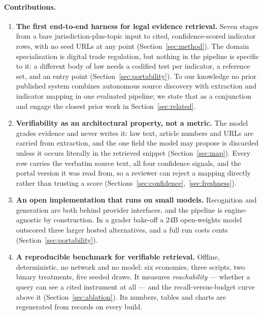 \documentclass{article}
\begin{document}
\paragraph{Contributions.}
\begin{enumerate}
\item \textbf{The first end-to-end harness for legal evidence retrieval.} Seven
stages from a bare jurisdiction-plus-topic input to cited, confidence-scored
indicator rows, with no seed URLs at any point (Section~\ref{sec:method}). The
domain specialisation is digital trade regulation, but nothing in the pipeline is
specific to it: a different body of law needs a codified test per indicator, a
reference set, and an entry point (Section~\ref{sec:portability}). To our
knowledge no prior published system combines autonomous source discovery with
extraction and indicator mapping in one evaluated pipeline; we state that as a
conjunction and engage the closest prior work in Section~\ref{sec:related}.

\item \textbf{Verifiability as an architectural property, not a metric.} The
model grades evidence and never writes it: law text, article numbers and URLs are
carried from extraction, and the one field the model may propose is discarded
unless it occurs literally in the retrieved snippet
(Section~\ref{sec:map}). Every row carries the verbatim source text, all four
confidence signals, and the portal version it was read from, so a reviewer can
reject a mapping directly rather than trusting a score
(Sections~\ref{sec:confidence},~\ref{sec:freshness}).

\item \textbf{An open implementation that runs on small models.} Recognition and
generation are both behind provider interfaces, and the pipeline is
engine-agnostic by construction. In a grader bake-off a 24B open-weights model
outscored three larger hosted alternatives, and a full run costs cents
(Section~\ref{sec:portability}).

\item \textbf{A reproducible benchmark for verifiable retrieval.} Offline,
deterministic, no network and no model: six economies, three scripts, two binary
treatments, five seeded draws. It measures \emph{reachability} --- whether a
query can see a cited instrument at all --- and the recall-versus-budget curve
above it (Section~\ref{sec:ablation}). Its numbers, tables and charts are
regenerated from records on every build.
\end{enumerate}
\end{document}

